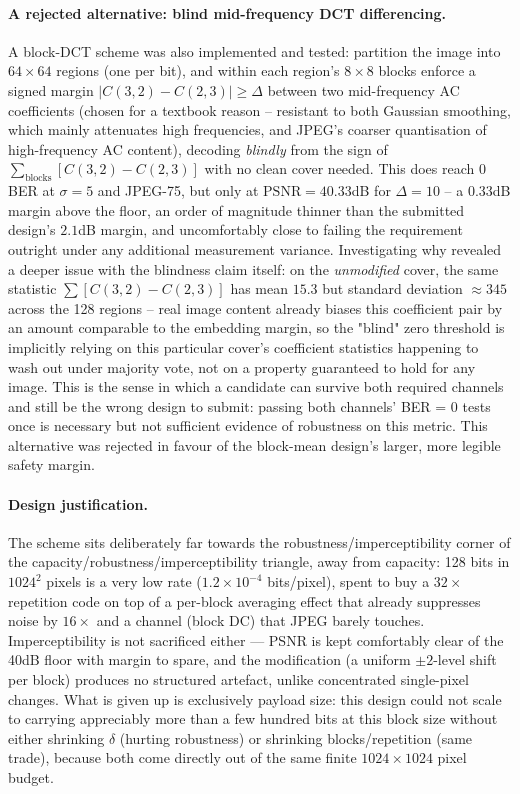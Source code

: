 \documentclass[11pt]{article}
\begin{document}
\paragraph{A rejected alternative: blind mid-frequency DCT differencing.}
A block-DCT scheme was also implemented and tested: partition the image into $64\times64$
regions (one per bit), and within each region's $8\times8$ blocks enforce a signed margin
$|C(3,2)-C(2,3)|\ge\Delta$ between two mid-frequency AC coefficients (chosen for a textbook
reason -- resistant to both Gaussian smoothing, which mainly attenuates high frequencies, and
JPEG's coarser quantisation of high-frequency AC content), decoding \emph{blindly} from the sign
of $\sum_{\text{blocks}}[C(3,2){-}C(2,3)]$ with no clean cover needed. This does reach 0 BER at
$\sigma=5$ and JPEG-75, but only at $\text{PSNR}=40.33$dB for $\Delta=10$ -- a $0.33$dB margin
above the floor, an order of magnitude thinner than the submitted design's $2.1$dB margin, and
uncomfortably close to failing the requirement outright under any additional measurement
variance. Investigating why revealed a deeper issue with the blindness claim itself: on the
\emph{unmodified} cover, the same statistic $\sum[C(3,2){-}C(2,3)]$ has mean $15.3$ but standard
deviation $\approx345$ across the 128 regions -- real image content already biases this
coefficient pair by an amount comparable to the embedding margin, so the "blind" zero threshold
is implicitly relying on this particular cover's coefficient statistics happening to wash out
under majority vote, not on a property guaranteed to hold for any image. This is the sense in
which a candidate can survive both required channels and still be the wrong design to submit:
passing both channels' BER = 0 tests once is necessary but not sufficient evidence of
robustness on this metric. This alternative was rejected in favour of the block-mean design's
larger, more legible safety margin.

\paragraph{Design justification.}
The scheme sits deliberately far towards the robustness/imperceptibility corner of the
capacity/robustness/imperceptibility triangle, away from capacity: 128 bits in $1024^2$ pixels
is a very low rate ($1.2\times10^{-4}$ bits/pixel), spent to buy a $32\times$ repetition code on
top of a per-block averaging effect that already suppresses noise by $16\times$ and a channel
(block DC) that JPEG barely touches. Imperceptibility is not sacrificed either --- PSNR is kept
comfortably clear of the 40dB floor with margin to spare, and the modification (a uniform
$\pm2$-level shift per block) produces no structured artefact, unlike concentrated single-pixel
changes. What is given up is exclusively payload size: this design could not scale to carrying
appreciably more than a few hundred bits at this block size without either shrinking $\delta$
(hurting robustness) or shrinking blocks/repetition (same trade), because both come directly out
of the same finite $1024\times1024$ pixel budget.
\end{document}
